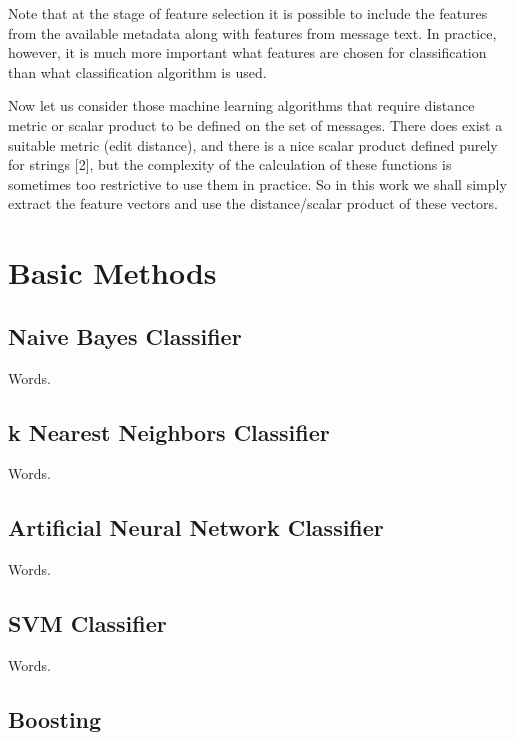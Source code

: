 \documentclass[12pt]{report}
\begin{document}
Note that at the stage of feature selection it is possible to include the features from the available metadata along with features from message text. In practice, however, it is much more important what features are chosen for classification than what classification algorithm is used.

Now let us consider those machine learning algorithms that require distance metric or scalar product to be defined on the set of messages. There does exist a suitable metric (edit distance), and there is a nice scalar product defined purely for strings [2], but the complexity of the calculation of these functions is sometimes too restrictive to use them in practice. So in this work we shall simply extract the feature vectors and use the distance/scalar product of these vectors.

\newpage


\chapter{Basic Methods}

\section{Naive Bayes Classifier}

Words.

\newpage

\section{k Nearest Neighbors Classifier}

Words.

\newpage

\section{Artificial Neural Network Classifier}

Words.

\newpage

\section{SVM Classifier}

Words.

\newpage

\section{Boosting}
\end{document}
